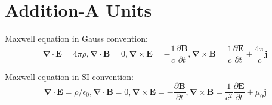 \documentclass[12pt]{article}
\numberwithin{equation}{section}
\begin{document}
\section{Addition-A Units}
	Maxwell equation in Gauss convention:
	\begin{equation}
		\bm{\nabla}\cdot\bm{E}=4\pi \rho,\bm{\nabla}\cdot\bm{B}=0,	
		\bm{\nabla}\times\bm{E}=-\frac{1}{c}\frac{\partial\bm{B}}{\partial t},
		\bm{\nabla}\times\bm{B}=\frac{1}{c}\frac{\partial\bm{E}}{\partial t}+\frac{4\pi}{c} \bm{j}
	\end{equation} \par
	Maxwell equation in SI convention:
	\begin{equation}
		\bm{\nabla}\cdot\bm{E}=\rho/\epsilon_0,\bm{\nabla}\cdot\bm{B}=0,	
		\bm{\nabla}\times\bm{E}=-\frac{\partial\bm{B}}{\partial t},
		\bm{\nabla}\times\bm{B}=\frac{1}{c^2}\frac{\partial\bm{E}}{\partial t}+\mu_0 \bm{j}
	\end{equation}
\renewcommand\refname{Reference}

 
\clearpage
\end{document}
